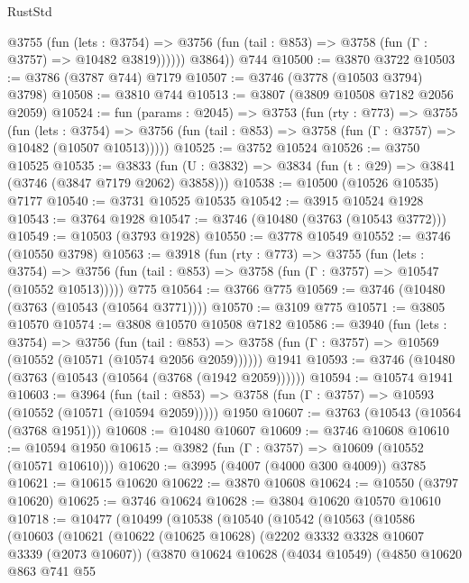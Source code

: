 \begin{lexlean}{RustStd}
\begin{coremodule}
            @3755
              (fun (lets : @3754) =>
              @3756 (fun (tail : @853) => @3758 (fun (Γ : @3757) => @10482 @3819))))))
        @3864))
    @744
@10500 := @3870 @3722
@10503 := @3786 (@3787 @744) @7179
@10507 := @3746 (@3778 (@10503 @3794) @3798)
@10508 := @3810 @744
@10513 := @3807 (@3809 @10508 @7182 @2056 @2059)
@10524 := fun (params : @2045) =>
  @3753
    (fun (rty : @773) =>
    @3755
      (fun (lets : @3754) =>
      @3756 (fun (tail : @853) => @3758 (fun (Γ : @3757) => @10482 (@10507 @10513)))))
@10525 := @3752 @10524
@10526 := @3750 @10525
@10535 := @3833
    (fun (U : @3832) => @3834 (fun (t : @29) => @3841 (@3746 (@3847 @7179 @2062) @3858)))
@10538 := @10500 (@10526 @10535) @7177
@10540 := @3731 @10525 @10535
@10542 := @3915 @10524 @1928
@10543 := @3764 @1928
@10547 := @3746 (@10480 (@3763 (@10543 @3772)))
@10549 := @10503 (@3793 @1928)
@10550 := @3778 @10549
@10552 := @3746 (@10550 @3798)
@10563 := @3918
    (fun (rty : @773) =>
    @3755
      (fun (lets : @3754) =>
      @3756 (fun (tail : @853) => @3758 (fun (Γ : @3757) => @10547 (@10552 @10513)))))
    @775
@10564 := @3766 @775
@10569 := @3746 (@10480 (@3763 (@10543 (@10564 @3771))))
@10570 := @3109 @775
@10571 := @3805 @10570
@10574 := @3808 @10570 @10508 @7182
@10586 := @3940
    (fun (lets : @3754) =>
    @3756
      (fun (tail : @853) =>
      @3758 (fun (Γ : @3757) => @10569 (@10552 (@10571 (@10574 @2056 @2059))))))
    @1941
@10593 := @3746 (@10480 (@3763 (@10543 (@10564 (@3768 (@1942 @2059))))))
@10594 := @10574 @1941
@10603 := @3964
    (fun (tail : @853) => @3758 (fun (Γ : @3757) => @10593 (@10552 (@10571 (@10594 @2059)))))
    @1950
@10607 := @3763 (@10543 (@10564 (@3768 @1951)))
@10608 := @10480 @10607
@10609 := @3746 @10608
@10610 := @10594 @1950
@10615 := @3982 (fun (Γ : @3757) => @10609 (@10552 (@10571 @10610)))
@10620 := @3995 (@4007 (@4000 @300 @4009)) @3785
@10621 := @10615 @10620
@10622 := @3870 @10608
@10624 := @10550 (@3797 @10620)
@10625 := @3746 @10624
@10628 := @3804 @10620 @10570 @10610
@10718 := @10477
    (@10499
      (@10538
        (@10540
          (@10542
            (@10563
              (@10586
                (@10603
                  (@10621
                    (@10622
                      (@10625 @10628)
                      (@2202 @3332 @3328 @10607 @3339 (@2073 @10607))
                      (@3870
                        @10624
                        @10628
                        (@4034 @10549)
                        (@4850
                          @10620
                          @863
                          @741
                          @55

\end{coremodule}
\end{lexlean}
